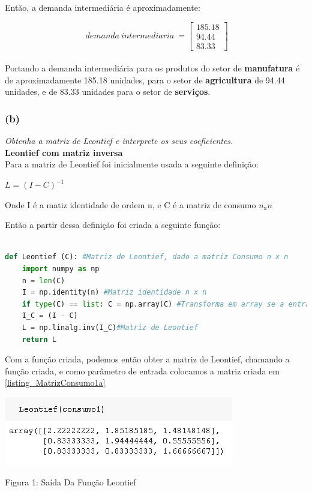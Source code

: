 \documentclass[a4paper, 12pt]{article}
\begin{document}
Então, a demanda intermediária é aproximadamente:

$$\boxed{\ \ demanda\ intermediaria\ =\begin{bmatrix}
185.18\\
94.44\\
83.33
\end{bmatrix}\ }$$\\


Portando a demanda intermediária para os produtos do setor de \textbf{manufatura} é de aproximadamente 185.18 unidades, para o setor de \textbf{agricultura} de 94.44 unidades, e de 83.33 unidades para o setor de \textbf{serviços}.

\subsubsection{(b)}

\textit {Obtenha a matriz de Leontief e interprete os seus coeficientes.}\\

\textbf{Leontief com matriz inversa}\\

Para a matriz de Leontief foi inicialmente usada a seguinte definição:

$L = (I - C)^{-1}$

Onde I é a matiz identidade de ordem n, e C é a matriz de consumo $n _\mathrm{x} n$

Então a partir dessa definição foi criada a seguinte função:

\begin{lstlisting}[language=Python, caption=Função Matriz de Leontief, label=listing_MatrizLeotief]

def Leontief (C): #Matriz de Leontief, dado a matriz Consumo n x n
    import numpy as np
    n = len(C)
    I = np.identity(n) #Matriz identidade n x n
    if type(C) == list: C = np.array(C) #Transforma em array se a entrada for lista
    I_C = (I - C)
    L = np.linalg.inv(I_C)#Matriz de Leontief
    return L

\end{lstlisting}

Com a função criada, podemos então obter a matriz de Leontief, chamando a função criada, e como parâmetro de entrada colocamos a matriz criada em \ref{listing_MatrizConsumo1a}

 \begin{center}
    \includegraphics{Leontief1b.PNG}
    
    Figura 1: Saída Da Função Leontief
\end{center}
\end{document}
